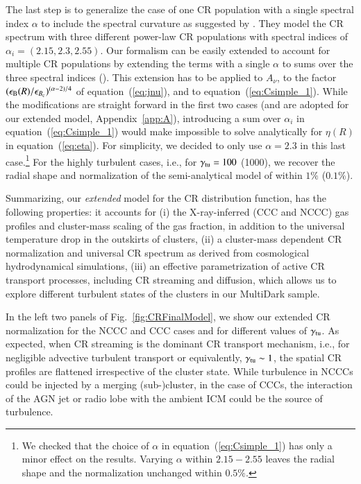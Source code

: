 \documentclass[useAMS,usenatbib]{mn2e}
\begin{document}
The last step is to generalize the case of one CR population with a single
spectral index $\alpha$ to include the spectral curvature as suggested by
\cite{2010MNRAS.409..449P}. They model the CR spectrum with three different
power-law CR populations with spectral indices of
$\alpha_{i}=(2.15,2.3,2.55)$. Our formalism can be easily extended to account
for multiple CR populations by extending the terms with a single $\alpha$ to
sums over the three spectral indices (\citealp{2010MNRAS.409..449P}). This
extension has to be applied to $A_{\nu}$, to the factor $(\epsilon_{{\mathrm{B}}}(R)/
\epsilon_{B_{{\mathrm{c}}}})^{(\alpha-2)/4}$ of equation~(\ref{eq:jnu}), and to
equation~(\ref{eq:Csimple_1}). While the modifications are straight forward in
the first two cases (and are adopted for our extended model,
Appendix~\ref{app:A}), introducing a sum over $\alpha_{i}$ in
equation~(\ref{eq:Csimple_1}) would make impossible to solve analytically for
$\eta(R)$ in equation~(\ref{eq:eta}). For simplicity, we decided to only use
$\alpha = 2.3$ in this last case.\footnote{We checked that the choice of
  $\alpha$ in equation~(\ref{eq:Csimple_1}) has only a minor effect on the
  results. Varying $\alpha$ within $2.15-2.55$ leaves the radial shape and the
  normalization unchanged within $0.5\%$.} For the highly turbulent cases, i.e.,
for $\gamma_{{\mathrm{tu}}}=100$ (1000), we recover the radial shape and
normalization of the semi-analytical model of \cite{2010MNRAS.409..449P} within
$1\%$ ($0.1\%$).

Summarizing, our \emph{extended} model for the CR distribution function, has the
following properties: it accounts for (i) the X-ray-inferred (CCC and NCCC) gas
profiles and cluster-mass scaling of the gas fraction, in addition to the
universal temperature drop in the outskirts of clusters, (ii) a cluster-mass
dependent CR normalization and universal CR spectrum as derived from
cosmological hydrodynamical simulations, (iii) an effective parametrization of
active CR transport processes, including CR streaming and diffusion, which
allows us to explore different turbulent states of the clusters in our MultiDark
sample.

In the left two panels of Fig.~\ref{fig:CRFinalModel}, we show our extended CR 
normalization for the NCCC and CCC cases and for different values of
$\gamma_{{\mathrm{tu}}}$.  As expected, when CR streaming is the dominant CR
transport mechanism, i.e., for negligible advective turbulent transport or
equivalently, $\gamma_{{\mathrm{tu}}}\sim1$, the spatial CR profiles are flattened
irrespective of the cluster state. While turbulence in NCCCs could be
injected by a merging (sub-)cluster, in the case of CCCs, the interaction of the
AGN jet or radio lobe with the ambient ICM could be the source of turbulence.
\end{document}
